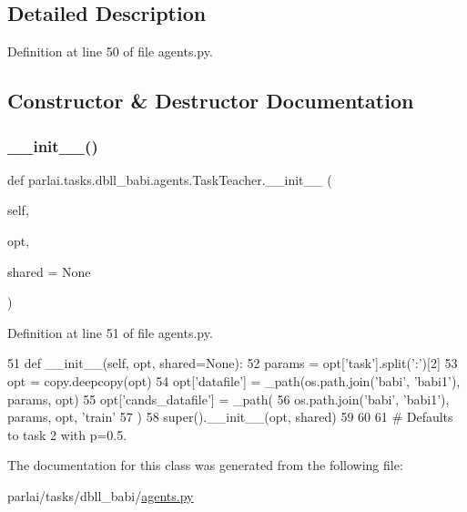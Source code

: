 \subsection{Detailed Description}


Definition at line 50 of file agents.\+py.



\subsection{Constructor \& Destructor Documentation}
\mbox{\label{classparlai_1_1tasks_1_1dbll__babi_1_1agents_1_1TaskTeacher_a8e42d5b61c8f9eebccd45c467506077d}} 
\subsubsection{\texorpdfstring{\+\_\+\+\_\+init\+\_\+\+\_\+()}{\_\_init\_\_()}}
{\footnotesize\ttfamily def parlai.\+tasks.\+dbll\+\_\+babi.\+agents.\+Task\+Teacher.\+\_\+\+\_\+init\+\_\+\+\_\+ (\begin{DoxyParamCaption}\item[{}]{self,  }\item[{}]{opt,  }\item[{}]{shared = {\ttfamily None} }\end{DoxyParamCaption})}



Definition at line 51 of file agents.\+py.


\begin{DoxyCode}
51     \textcolor{keyword}{def }\_\_init\_\_(self, opt, shared=None):
52         params = opt[\textcolor{stringliteral}{'task'}].split(\textcolor{stringliteral}{':'})[2]
53         opt = copy.deepcopy(opt)
54         opt[\textcolor{stringliteral}{'datafile'}] = \_path(os.path.join(\textcolor{stringliteral}{'babi'}, \textcolor{stringliteral}{'babi1'}), params, opt)
55         opt[\textcolor{stringliteral}{'cands\_datafile'}] = \_path(
56             os.path.join(\textcolor{stringliteral}{'babi'}, \textcolor{stringliteral}{'babi1'}), params, opt, \textcolor{stringliteral}{'train'}
57         )
58         super().\_\_init\_\_(opt, shared)
59 
60 
61 \textcolor{comment}{# Defaults to task 2 with p=0.5.}
\end{DoxyCode}


The documentation for this class was generated from the following file\+:\begin{DoxyCompactItemize}
\item 
parlai/tasks/dbll\+\_\+babi/\hyperlink{parlai_2tasks_2dbll__babi_2agents_8py}{agents.\+py}\end{DoxyCompactItemize}

